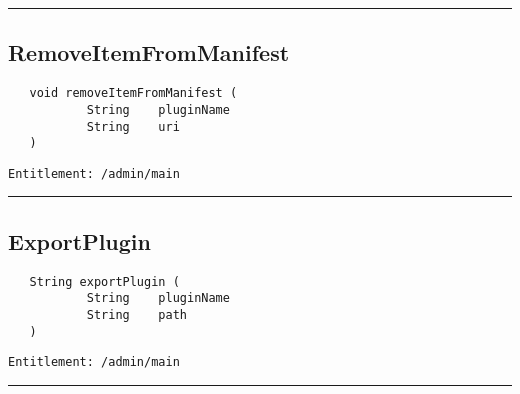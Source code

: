 \rule{12cm}{2pt}
\subsection{RemoveItemFromManifest}
\label{Api:RemoveItemFromManifest}
\begin{verbatim}
   void removeItemFromManifest (
           String    pluginName
           String    uri
   )
\end{verbatim}
\begin{Verbatim}[fontsize=\small, formatcom=\color{Maroon}]
  Entitlement: /admin/main
\end{Verbatim}



\rule{12cm}{2pt}
\subsection{ExportPlugin}
\label{Api:ExportPlugin}
\begin{verbatim}
   String exportPlugin (
           String    pluginName
           String    path
   )
\end{verbatim}
\begin{Verbatim}[fontsize=\small, formatcom=\color{Maroon}]
  Entitlement: /admin/main
\end{Verbatim}



\rule{12cm}{2pt}
